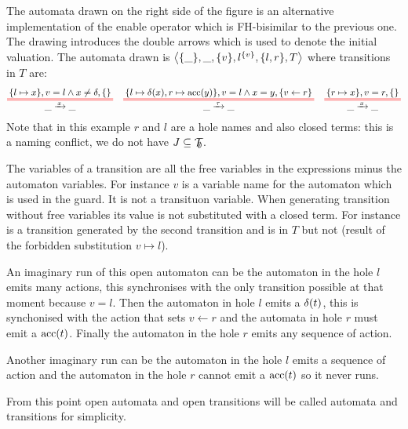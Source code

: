 \documentclass{article}
\begin{document}
\begin{exi}
The automata drawn on the right side of the figure is an alternative implementation of the enable operator which is FH-bisimilar to the previous one.
The drawing introduces the double arrows which is used to denote the initial valuation.
The automata drawn is \(\left<{\left\{\_\right\}},\_,{\left\{v\right\}},l^{\left\{v\right\}},{\left\{l, r\right\}},T\right>\) where transitions in \(T\) are:
\begin{align*}
	\OT{\_}{\_}{x}{\mbrc{l \mapsto x}}{v = l \wedge x \neq \delta}{\mbrc{}} &&
	\OT{\_}{\_}{\tau}{\mbrc{l \mapsto \delta\mpar{x}, r \mapsto \act{acc}\mpar{y}}}{v = l \wedge x = y}{\mbrc{v \gets r}} &&
	\OT{\_}{\_}{x}{\mbrc{r \mapsto x}}{v = r}{\mbrc{}}
\end{align*}
Note that in this example \(r\) and \(l\) are a hole names and also closed terms: this is a naming conflict, we do not have \(J \subseteq {\mathcal{T}}_{\!\!\emptyset}\).

The variables of a transition are all the free variables in the expressions minus the automaton variables.
For instance \(v\) is a variable name for the automaton which is used in the guard.
It is not a transituon variable.
When generating transition without free variables its value is not substituted with a closed term.
For instance  is a transition generated by the second transition and is in \(T\) but not  (result of the forbidden substitution \(v \mapsto l\)).

An imaginary run of this open automaton can be the automaton in the hole \(l\) emits many actions, this synchronises with the only transition possible at that moment because \(v = l\).
Then the automaton in hole \(l\) emits a \(\delta{\left(t\right)}\), this is synchonised with the action that sets \(v \gets r\) and the automata in hole \(r\) must emit a \(\mathrm{acc}{\left(t\right)}\).
Finally the automaton in the hole \(r\) emits any sequence of action.

Another imaginary run can be the automaton in the hole \(l\) emits a sequence of action and the automaton in the hole \(r\) cannot emit a \(\mathrm{acc}{\left(t\right)}\) so it never runs.
\end{exi}

From this point open automata and open transitions will be called automata and transitions for simplicity.
\end{document}
